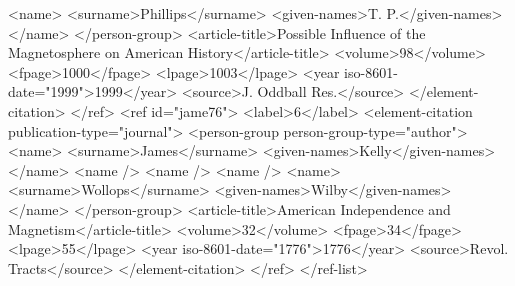         <name>
          <surname>Phillips</surname>
          <given-names>T. P.</given-names>
        </name>
      </person-group>
      <article-title>Possible Influence of the Magnetosphere on {American} History</article-title>
      <volume>98</volume>
      <fpage>1000</fpage>
      <lpage>1003</lpage>
      <year iso-8601-date="1999">1999</year>
      <source>J. Oddball Res.</source>
    </element-citation>
  </ref>
  <ref id="jame76">
    <label>6</label>
    <element-citation publication-type="journal">
      <person-group person-group-type="author">
        <name>
          <surname>James</surname>
          <given-names>Kelly</given-names>
        </name>
        <name />
        <name />
        <name />
        <name>
          <surname>Wollops</surname>
          <given-names>Wilby</given-names>
        </name>
      </person-group>
      <article-title>{American} Independence and Magnetism</article-title>
      <volume>32</volume>
      <fpage>34</fpage>
      <lpage>55</lpage>
      <year iso-8601-date="1776">1776</year>
      <source>Revol. Tracts</source>
    </element-citation>
  </ref>
</ref-list>